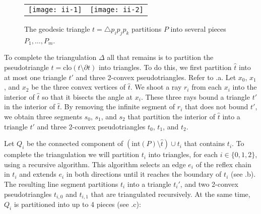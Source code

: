 \documentclass[acmtalg]{acmsmall}
\newcommand{\boundary}{\partial}
\newcommand{\closure}{\mathrm{clo}}
\newcommand{\interior}{\mathrm{int}}
\newcommand{\z}[1]{{\hat{#1}}}
\begin{document}
\begin{figure}
  \begin{center}
    \begin{tabular}{cc}
      \texttt{[image: ii-1]} & 
      \texttt{[image: ii-2]} 
    \end{tabular}
  \end{center}
  \caption{The geodesic triangle $t=\triangle p_i p_j p_k$ partitions $P$ into several
pieces $P_1,\ldots,P_m$.}
\end{figure}

To complete the triangulation $\Delta$ all that remains is to partition
the pseudotriangle $\z t=\closure(t\setminus \boundary t)$ into triangles.
To do this, we first partition $\z t$ into at most one triangle $t'$
and three 2-convex pseudotriangles. Refer to .a. Let
$x_0$, $x_1$, and $x_2$ be the three convex vertices of $\z t$.  We shoot
a ray $r_i$ from each $x_i$ into the interior of $\z t$ so that it
bisects the angle at $x_i$.  These three rays bound a triangle $t'$
in the interior of $\z t$. By removing the infinite segment of $r_i$
that does not bound $t'$, we obtain three segments $s_0$, $s_1$, and
$s_2$ that partition the interior of $\z t$ into a triangle $t'$ and
three 2-convex pseudotriangles $t_0$, $t_1$, and $t_2$.

Let $Q_i$ be the connected component of $(\interior(P)\setminus
\z t)\cup t_i$ that contains $t_i$.  To complete the triangulation
we will partition $t_i$ into triangles, for each $i\in\{0,1,2\}$,
using a recursive algorithm.  This algorithm selects an edge $e_i$
of the reflex chain in $t_i$ and extends $e_i$ in both directions
until it reaches the boundary of $t_i$ (see .b).
The resulting line segment partitions $t_i$ into a triangle $t_i'$, and
two 2-convex pseudotriangles $t_{i,0}$ and $t_{i,1}$ that are triangulated
recursively.  At the same time, $Q_i$ is partitioned into up to 4 pieces
(see .c):
\end{document}
